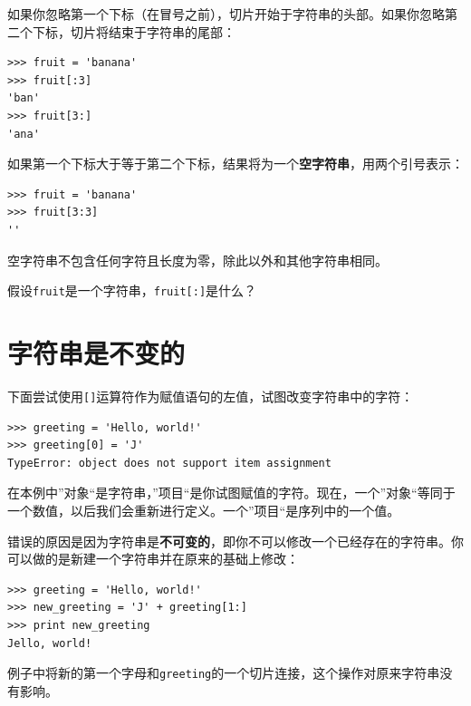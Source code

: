 如果你忽略第一个下标（在冒号之前），切片开始于字符串的头部。如果你忽略第二个下标，切片将结束于字符串的尾部：

\beforeverb
\begin{verbatim}
>>> fruit = 'banana'
>>> fruit[:3]
'ban'
>>> fruit[3:]
'ana'
\end{verbatim}
\afterverb
%
如果第一个下标大于等于第二个下标，结果将为一个{\bf 空字符串}，用两个引号表示：


\beforeverb
\begin{verbatim}
>>> fruit = 'banana'
>>> fruit[3:3]
''
\end{verbatim}
\afterverb
%
空字符串不包含任何字符且长度为零，除此以外和其他字符串相同。

\begin{ex}
假设{\tt fruit}是一个字符串，{\tt fruit[:]}是什么？


\end{ex}


\section{字符串是不变的}

下面尝试使用{\tt []}运算符作为赋值语句的左值，试图改变字符串中的字符：


\beforeverb
\begin{verbatim}
>>> greeting = 'Hello, world!'
>>> greeting[0] = 'J'
TypeError: object does not support item assignment
\end{verbatim}
\afterverb
%
在本例中”对象“是字符串，”项目“是你试图赋值的字符。现在，一个”对象“等同于一个数值，以后我们会重新进行定义。一个”项目“是序列中的一个值。


错误的原因是因为字符串是{\bf 不可变的}，即你不可以修改一个已经存在的字符串。你可以做的是新建一个字符串并在原来的基础上修改：

\beforeverb
\begin{verbatim}
>>> greeting = 'Hello, world!'
>>> new_greeting = 'J' + greeting[1:]
>>> print new_greeting
Jello, world!
\end{verbatim}
\afterverb
%
例子中将新的第一个字母和{\tt greeting}的一个切片连接，这个操作对原来字符串没有影响。

